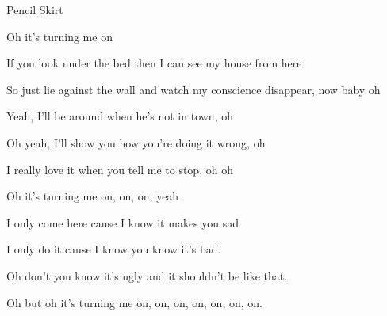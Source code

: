 \begin{song}{Pencil Skirt}{
	
	\chordset[Verse]{ \CMaj \AMaj \DMaj \GMaj }
	\chordset[Chorus]{ \EmShAm \CMajShE \DMajShA \GMajShE}
}
\begin{songverse}
 
 Oh it's turning me on

\end{songverse}


\begin{songverse}
 If you look under the bed then I can see my house from here

 So just lie against  the wall and watch my  conscience disappear, now baby oh


 Yeah, I'll be around when he's not in town, oh
 
 
 Oh yeah, I'll show you how you're doing it wrong, oh
 
 
 I really love it when you tell me to stop, oh oh
 
                  
 Oh it's turning me on, on, on, yeah

\end{songverse}


 \begin{songverse}

 \hspace{10pt}I only come here cause I know it makes you sad
 
 
 
 \hspace{10pt}I only do it cause I know you know it's bad.
 
 
 
 \hspace{10pt}Oh don't you know it's ugly and it shouldn't be like that.
 
                          
 \hspace{10pt}Oh but oh it's turning me on, on, on, on, on, on, on.


  \hspace{15pt}   \hspace{15pt}     \hspace{15pt}   
 \end{songverse}

\end{song}
